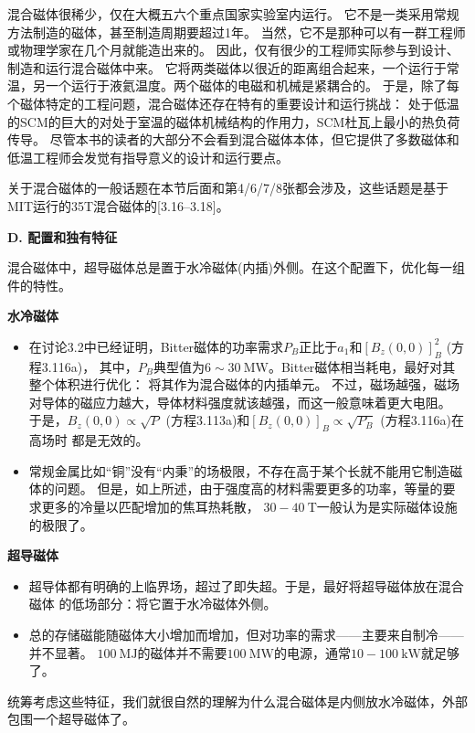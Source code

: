 混合磁体很稀少，仅在大概五六个重点国家实验室内运行。
它不是一类采用常规方法制造的磁体，甚至制造周期要超过1年。
当然，它不是那种可以有一群工程师或物理学家在几个月就能造出来的。
因此，仅有很少的工程师实际参与到设计、制造和运行混合磁体中来。
它将两类磁体以很近的距离组合起来，一个运行于常温，另一个运行于液氦温度。两个磁体的电磁和机械是紧耦合的。
于是，除了每个磁体特定的工程问题，混合磁体还存在特有的重要设计和运行挑战：
处于低温的SCM的巨大的对处于室温的磁体机械结构的作用力，SCM杜瓦上最小的热负荷传导。
尽管本书的读者的大部分不会看到混合磁体本体，但它提供了多数磁体和低温工程师会发觉有指导意义的设计和运行要点。

关于混合磁体的一般话题在本节后面和第4/6/7/8张都会涉及，这些话题是基于MIT运行的35T混合磁体的[3.16–3.18]。

\textbf{D. 配置和独有特征}

混合磁体中，超导磁体总是置于水冷磁体(内插)外侧。在这个配置下，优化每一组件的特性。

\textbf{\kaishu 水冷磁体}
\begin{itemize}
	\item 在讨论3.2中已经证明，Bitter磁体的功率需求$P_B$正比于$a_1$和$[B_z(0, 0)]^2_B$ (方程3.116a)，
	其中，$P_B$典型值为$6\sim 30\ \mathrm{MW}$。Bitter磁体相当耗电，最好对其整个体积进行优化：
	将其作为混合磁体的内插单元。
	不过，磁场越强，磁场对导体的磁应力越大，导体材料强度就该越强，而这一般意味着更大电阻。
	于是，$B_z(0, 0)\propto\sqrt{P}$ (方程3.113a)和$[B_z(0, 0)]_B\propto\sqrt{P_B}$ (方程3.116a)在高场时
	都是无效的。
	
	\item 常规金属比如“铜”没有“内秉”的场极限，不存在高于某个长就不能用它制造磁体的问题。
	但是，如上所述，由于强度高的材料需要更多的功率，等量的要求更多的冷量以匹配增加的焦耳热耗散，
	$30-40\ \mathrm{T}$一般认为是实际磁体设施的极限了。
\end{itemize}

\textbf{\kaishu 超导磁体}
\begin{itemize}
	\item 超导体都有明确的上临界场，超过了即失超。于是，最好将超导磁体放在混合磁体
	的低场部分：将它置于水冷磁体外侧。
	
	\item 总的存储磁能随磁体大小增加而增加，但对功率的需求——主要来自制冷——并不显著。
	$100\ \mathrm{MJ}$的磁体并不需要$100\ \mathrm{MW}$的电源，通常$10-100\ \mathrm{kW}$就足够了。
\end{itemize}

统筹考虑这些特征，我们就很自然的理解为什么混合磁体是内侧放水冷磁体，外部包围一个超导磁体了。

